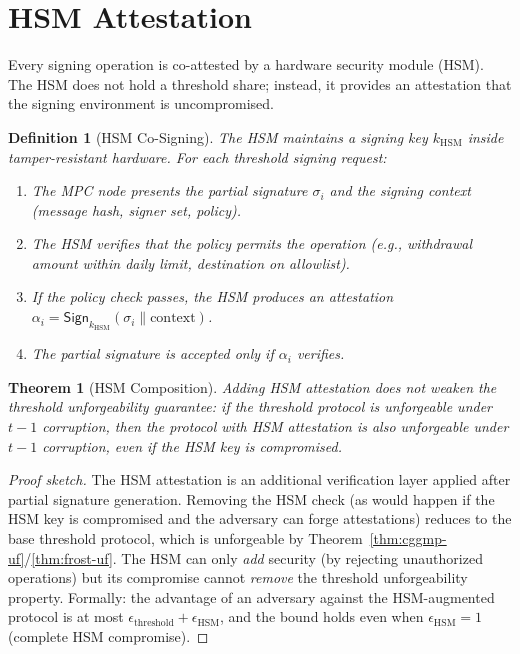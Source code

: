 \documentclass[11pt,a4paper]{article}
\newtheorem{theorem}{Theorem}[section]
\newtheorem{definition}{Definition}[section]
\begin{document}
\section{HSM Attestation}
\label{sec:hsm}

Every signing operation is co-attested by a hardware security module
(HSM).  The HSM does not hold a threshold share; instead, it provides
an attestation that the signing environment is uncompromised.

\begin{definition}[HSM Co-Signing]
The HSM maintains a signing key $k_{\text{HSM}}$ inside tamper-resistant
hardware.  For each threshold signing request:
\begin{enumerate}[nosep]
  \item The MPC node presents the partial signature $\sigma_i$ and
        the signing context (message hash, signer set, policy).
  \item The HSM verifies that the policy permits the operation (e.g.,
        withdrawal amount within daily limit, destination on allowlist).
  \item If the policy check passes, the HSM produces an attestation
        $\alpha_i = \mathsf{Sign}_{k_{\text{HSM}}}(\sigma_i \|
        \text{context})$.
  \item The partial signature is accepted only if $\alpha_i$ verifies.
\end{enumerate}
\end{definition}

\begin{theorem}[HSM Composition]
\label{thm:hsm-compose}
Adding HSM attestation does not weaken the threshold unforgeability
guarantee: if the threshold protocol is unforgeable under $t-1$
corruption, then the protocol with HSM attestation is also unforgeable
under $t-1$ corruption, even if the HSM key is compromised.
\end{theorem}

\begin{proof}[Proof sketch]
The HSM attestation is an additional verification layer applied after
partial signature generation.  Removing the HSM check (as would happen
if the HSM key is compromised and the adversary can forge attestations)
reduces to the base threshold protocol, which is unforgeable by
Theorem~\ref{thm:cggmp-uf}/\ref{thm:frost-uf}.  The HSM can only
\emph{add} security (by rejecting unauthorized operations) but its
compromise cannot \emph{remove} the threshold unforgeability property.
Formally: the advantage of an adversary against the HSM-augmented
protocol is at most $\epsilon_{\text{threshold}} +
\epsilon_{\text{HSM}}$, and the bound holds even when
$\epsilon_{\text{HSM}} = 1$ (complete HSM compromise).
\end{proof}
\end{document}
